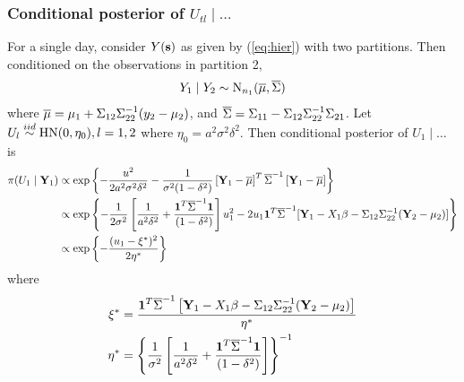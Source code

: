 \subsubsection*{Conditional posterior of $U_{tl} \mid \ldots $}\label{s:mvcondu}
For a single day, consider $Y(\mbox{\bf s})$ as given by (\ref{eq:hier}) with two partitions.
Then conditioned on the observations in partition 2,  
\begin{align}
  Y_{1} \mid Y_{2} \sim \mbox{N}_{n_1} (\overline{\mu}, \overline{\Sigma})
\end{align}
where $\overline{\mu} = \mu_1 + \Sigma_{12} \Sigma_{22}^{-1}(y_{2} - \mu_{2})$, and $\overline{\Sigma} = \Sigma_{11} - \Sigma_{12} \Sigma_{22}^{-1}\Sigma_{21}$. 
Let $U_{l} \stackrel{iid}{\sim} \mbox{HN}(0, \eta_0), l = 1, 2$ where $\eta_0 = a^2 \sigma^2 \delta^2$.
Then conditional posterior of $U_{1} \mid \ldots $ is
\begin{align*}
  \pi(U_{1} \mid \mbox{\bf Y}_{1}) & \propto \exp \left\{ -\frac{ u^2 }{ 2 a^2 \sigma^2 \delta^2 } - \frac{ 1 }{ \sigma^2 (1 - \delta^2 ) } \left[ \mbox{\bf Y}_{1} - \overline{\mu} \right]^T \overline{\Sigma}^{-1} \left[ \mbox{\bf Y}_{1} - \overline{\mu} \right] \right\}\\
  & \propto \exp \left\{ - \frac{1}{2 \sigma^2} \left[ \frac{ 1 }{ a^2 \delta^2 } + \frac{ \mbox{\boldmath $1$}^T \overline{\Sigma}^{-1} \mbox{\boldmath $1$} }{ (1 - \delta^2) } \right] u_1^2  - 2u_1\mbox{\boldmath $1$}^T \overline{\Sigma}^{-1} [\mbox{\bf Y}_{1} - X_{1}\beta - \Sigma_{12} \Sigma_{22}^{-1} (\mbox{\bf Y}_{2} - \mu_2)] \right\}\\
  & \propto \exp \left \{ -\frac{ (u_1 - \xi^*)^2 }{ 2 \eta^{*} } \right \}
\end{align*}
where
\begin{align*}
  \xi^* &= \frac{ \mbox{\boldmath $1$}^T \overline{\Sigma}^{-1}\left[ \mbox{\bf Y}_{1} - X_{1}\beta - \Sigma_{12} \Sigma_{22}^{-1} (\mbox{\bf Y}_2 - \mu_2)\right]}{\eta^*}\\
  \eta^* &= \left\{ \frac{ 1}{ \sigma^2 } \left[ \frac{ 1 }{ a^2 \delta^2 } + \frac{ \mbox{\boldmath $1$}^T \overline{\Sigma}^{-1} \mbox{\boldmath $1$} }{ (1 - \delta^2 )} \right] \right\}^{-1}
\end{align*}


